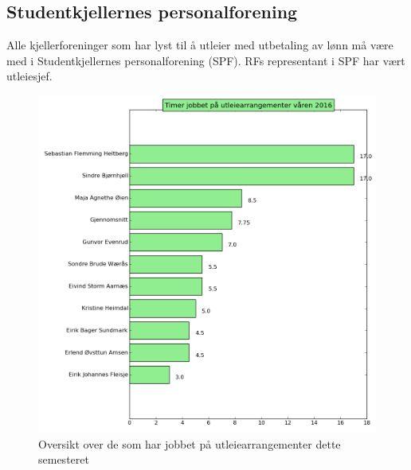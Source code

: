 \documentclass[12pt]{article}
\begin{document}
\subsection*{Studentkjellernes personalforening}
Alle kjellerforeninger som har lyst til å utleier med utbetaling av lønn
må være med i Studentkjellernes personalforening (SPF).
RFs representant i SPF har vært utleiesjef.

\newpage

\begin{figure}[!ht]
  \centering
      \includegraphics[width=1.0\textwidth]{utleiebar-V16.png}
  \caption{Oversikt over de som har jobbet på utleiearrangementer 
      dette semesteret}
\end{figure}
\end{document}
